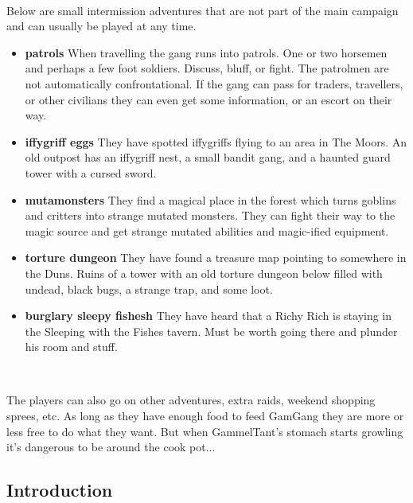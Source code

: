 \

Below are small intermission adventures that are not part of the main campaign and can usually be played at any time.

\begin{itemize}

    \item \textbf{patrols} When travelling the gang runs into patrols. One or two horsemen and perhaps a few foot soldiers. Discuss, bluff, or fight. The patrolmen are not automatically confrontational. If the gang can pass for traders, travellers, or other civilians they can even get some information, or an escort on their way.

    \item \textbf{iffygriff eggs} They have spotted iffygriffs flying to an area in The Moors. An old outpost has an iffygriff nest, a small bandit gang, and a haunted guard tower with a cursed sword.

    \item \textbf{mutamonsters} They find a magical place in the forest which turns goblins and critters into strange mutated monsters. They can fight their way to the magic source and get strange mutated abilities and magic-ified equipment.

    \item \textbf{torture dungeon} They have found a treasure map pointing to somewhere in the Duns. Ruins of a tower with an old torture dungeon below filled with undead, black bugs, a strange trap, and some loot.

    \item \textbf{burglary sleepy fishesh} They have heard that a Richy Rich is staying in the Sleeping with the Fishes tavern. Must be worth going there and plunder his room and stuff.

\end{itemize}

\

The players can also go on other adventures, extra raids, weekend shopping sprees, etc. As long as they have enough food to feed GamGang they are more or less free to do what they want. But when GammelTant's stomach starts growling it's dangerous to be around the cook pot...


\subsection*{Introduction}


